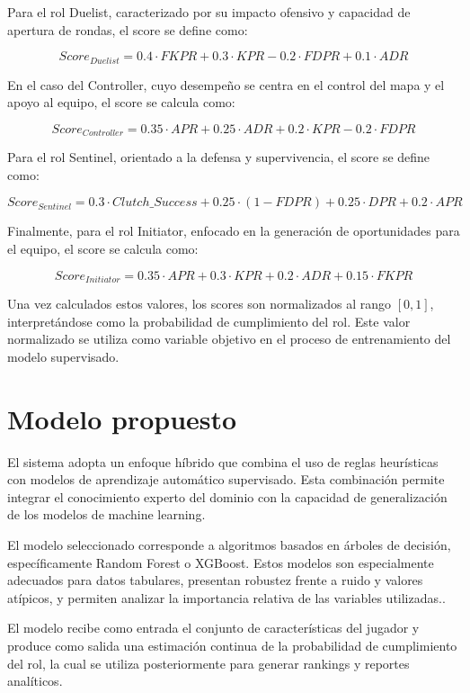 \documentclass{ULBreport} %
\begin{document}
Para el rol Duelist, caracterizado por su impacto ofensivo y capacidad de apertura de rondas, el score se define como:

\[
Score_{Duelist} = 0.4 \cdot FKPR + 0.3 \cdot KPR - 0.2 \cdot FDPR + 0.1 \cdot ADR
\]

En el caso del Controller, cuyo desempeño se centra en el control del mapa y el apoyo al equipo, el score se calcula como:

\[
Score_{Controller} = 0.35 \cdot APR + 0.25 \cdot ADR + 0.2 \cdot KPR - 0.2 \cdot FDPR
\]

Para el rol Sentinel, orientado a la defensa y supervivencia, el score se define como:

\[
Score_{Sentinel} = 0.3 \cdot Clutch\_Success + 0.25 \cdot (1 - FDPR) + 0.25 \cdot DPR + 0.2 \cdot APR
\]

Finalmente, para el rol Initiator, enfocado en la generación de oportunidades para el equipo, el score se calcula como:

\[
Score_{Initiator} = 0.35 \cdot APR + 0.3 \cdot KPR + 0.2 \cdot ADR + 0.15 \cdot FKPR
\]

Una vez calculados estos valores, los scores son normalizados al rango $[0,1]$, interpretándose como la probabilidad de cumplimiento del rol. Este valor normalizado se utiliza como variable objetivo en el proceso de entrenamiento del modelo supervisado.

\section{Modelo propuesto}

El sistema adopta un enfoque híbrido que combina el uso de reglas heurísticas con modelos de aprendizaje automático supervisado. Esta combinación permite integrar el conocimiento experto del dominio con la capacidad de generalización de los modelos de machine learning.

El modelo seleccionado corresponde a algoritmos basados en árboles de decisión, específicamente Random Forest o XGBoost. Estos modelos son especialmente adecuados para datos tabulares, presentan robustez frente a ruido y valores atípicos, y permiten analizar la importancia relativa de las variables utilizadas.\cite{breiman}.

El modelo recibe como entrada el conjunto de características del jugador y produce como salida una estimación continua de la probabilidad de cumplimiento del rol, la cual se utiliza posteriormente para generar rankings y reportes analíticos.
\end{document}
